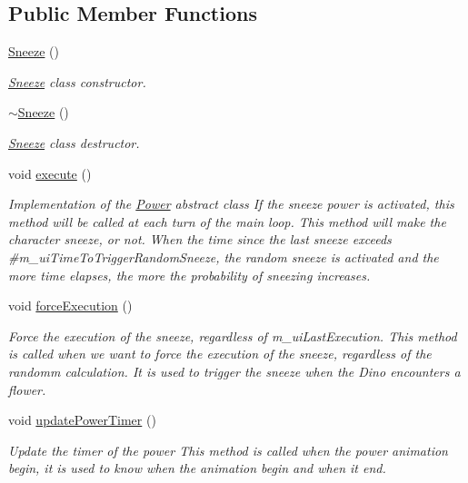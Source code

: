 \subsection*{Public Member Functions}
\begin{DoxyCompactItemize}
\item 
\hyperlink{class_symp_1_1_sneeze_a13fbccbd6a1f4cf90e5dec41ace022c8}{Sneeze} ()
\begin{DoxyCompactList}\small\item\em \hyperlink{class_symp_1_1_sneeze}{Sneeze} class constructor. \end{DoxyCompactList}\item 
\hyperlink{class_symp_1_1_sneeze_aad72c8ab50d872b9dcdb1e8cab38755e}{$\sim$\-Sneeze} ()
\begin{DoxyCompactList}\small\item\em \hyperlink{class_symp_1_1_sneeze}{Sneeze} class destructor. \end{DoxyCompactList}\item 
void \hyperlink{class_symp_1_1_sneeze_aaaf79da47ab1a8888f4af276e31087f1}{execute} ()
\begin{DoxyCompactList}\small\item\em Implementation of the \hyperlink{class_symp_1_1_power}{Power} abstract class If the sneeze power is activated, this method will be called at each turn of the main loop. This method will make the character sneeze, or not. When the time since the last sneeze exceeds \#m\-\_\-ui\-Time\-To\-Trigger\-Random\-Sneeze, the random sneeze is activated and the more time elapses, the more the probability of sneezing increases. \end{DoxyCompactList}\item 
void \hyperlink{class_symp_1_1_sneeze_a76aec7dca3104e9e0b8c2dade0d9eac9}{force\-Execution} ()
\begin{DoxyCompactList}\small\item\em Force the execution of the sneeze, regardless of m\-\_\-ui\-Last\-Execution. This method is called when we want to force the execution of the sneeze, regardless of the randomm calculation. It is used to trigger the sneeze when the Dino encounters a flower. \end{DoxyCompactList}\item 
void \hyperlink{class_symp_1_1_sneeze_aafc16f638a08e04c171944adfef888b2}{update\-Power\-Timer} ()
\begin{DoxyCompactList}\small\item\em Update the timer of the power This method is called when the power animation begin, it is used to know when the animation begin and when it end. \end{DoxyCompactList}\item 

\end{DoxyCompactItemize}
